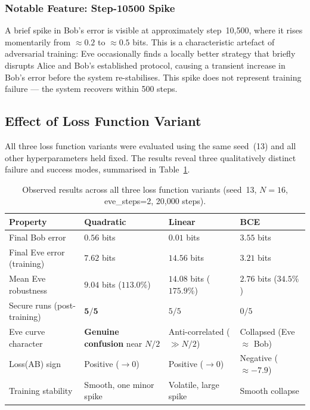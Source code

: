 \documentclass[12pt, a4paper]{article}
\begin{document}
\subsubsection*{Notable Feature: Step-10500 Spike}

A brief spike in Bob's error is visible at approximately step~10{,}500,
where it rises momentarily from $\approx 0.2$ to $\approx 0.5$ bits.
This is a characteristic artefact of adversarial training: Eve
occasionally finds a locally better strategy that briefly disrupts
Alice and Bob's established protocol, causing a transient increase
in Bob's error before the system re-stabilises. This spike does not
represent training failure --- the system recovers within 500 steps.

\subsection{Effect of Loss Function Variant}
\label{subsec:loss_variant_results}

All three loss function variants were evaluated using the same seed~(13)
and all other hyperparameters held fixed. The results reveal three
qualitatively distinct failure and success modes, summarised in
Table~\ref{tab:loss_variant_results}.

\begin{table}[H]
  \centering
  \caption{Observed results across all three loss function variants
           (seed~13, $N=16$, eve\_steps=2, 20{,}000 steps).}
  \label{tab:loss_variant_results}
  \renewcommand{\arraystretch}{1.5}
  \begin{tabularx}{\linewidth}{@{} l X X X @{}}
    \toprule
    \textbf{Property} & \textbf{Quadratic} &
    \textbf{Linear} & \textbf{BCE} \\
    \midrule
    Final Bob error &
      $\mathbf{0.56}$ bits &
      $0.01$ bits &
      $3.55$ bits \\[4pt]
    Final Eve error (training) &
      $\mathbf{7.62}$ bits &
      $14.56$ bits &
      $3.21$ bits \\[4pt]
    Mean Eve robustness &
      $\mathbf{9.04}$ bits ($113.0\%$) &
      $14.08$ bits ($175.9\%$) &
      $2.76$ bits ($34.5\%$) \\[4pt]
    Secure runs (post-training) &
      $\mathbf{5/5}$ &
      $5/5$ &
      $0/5$ \\[4pt]
    Eve curve character &
      \textbf{Genuine confusion} near $N/2$ &
      Anti-correlated ($\gg N/2$) &
      Collapsed (Eve $\approx$ Bob) \\[4pt]
    Loss(AB) sign &
      Positive ($\to 0$) &
      Positive ($\to 0$) &
      Negative ($\approx -7.9$) \\[4pt]
    Training stability &
      Smooth, one minor spike &
      Volatile, large spike &
      Smooth collapse \\
    \bottomrule
  \end{tabularx}
\end{table}
\end{document}
